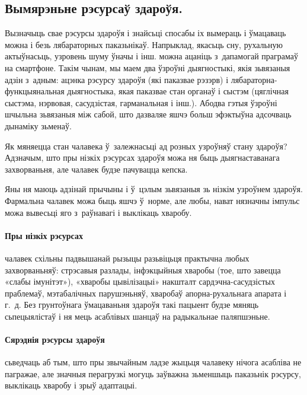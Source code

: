 \subsection*{Вымярэньне рэсурсаў здароўя.}

Вызначыць свае рэсурсы здароўя і знайсьці спосабы іх вымераць і ўмацаваць можна і безь лябараторных паказьнікаў. Напрыклад, якасьць сну, рухальную актыўнасьць, узровень шуму ўначы і інш. можна ацаніць з~дапамогай праграмаў на смартфоне. Такім чынам, мы маем два ўзроўні дыягностыкі, якія зьвязаныя адзін з~адным: ацэнка рэсурсу здароўя (які паказвае рэзэрв) і лябараторна-функцыянальная дыягностыка, якая паказвае стан органаў і сыстэм (цяглічная сыстэма, нэрвовая, сасудзістая, гарманальная і інш.). Абодва гэтыя ўзроўні шчыльна зьвязаныя між сабой, што дазваляе яшчэ больш эфэктыўна адсочваць дынаміку зьменаў.

Як мяняецца стан чалавека ў~залежнасьці ад розных узроўняў стану здароўя? Адзначым, што пры нізкіх рэсурсах здароўя можа ня быць дыягнаставанага захворваньня, але чалавек будзе пачувацца кепска. 


Яны ня маюць адзінай прычыны і ў~цэлым зьвязаныя зь нізкім узроўнем здароўя. Фармальна чалавек можа быць яшчэ ў~норме, але любы, нават нязначны імпульс можа вывесьці яго з~раўнавагі і выклікаць хваробу.

\paragraph{Пры нізкіх рэсурсах} чалавек схільны падвышанай рызыцы разьвіцьця практычна любых захворваньняў: стрэсавыя разлады, інфэкцыйныя хваробы (тое, што завецца «слабы імунітэт»), «хваробы цывілізацыі» накшталт сардэчна-сасудзістых праблемаў, мэтабалічных парушэньняў, хваробаў апорна-рухальнага апарата і г.~д. Без грунтоўнага ўмацаваньня здароўя такі пацыент будзе мяняць сьпецыялістаў і ня мець асаблівых шанцаў на радыкальнае паляпшэньне.

\paragraph{Сярэднія рэсурсы здароўя} сьведчаць аб тым, што пры звычайным ладзе жыцьця чалавеку нічога асабліва не пагражае, але значныя перагрузкі могуць заўважна зьменшыць паказьнік рэсурсу, выклікаць хваробу і зрыў адаптацыі. 

